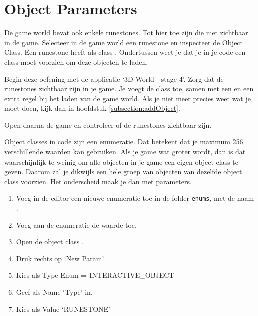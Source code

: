 \chapter{Object Parameters}
De game world bevat ook enkele runestones. Tot hier toe zijn die niet zichtbaar in de game. Selecteer in de game world een runestone en inspecteer de Object Class. Een runestone heeft als class . Ondertussen weet je dat je in je code een class moet voorzien om deze objecten te laden.

\begin{exercise}
	Begin deze oefening met de applicatie `3D World - stage 4'. Zorg dat de runestones zichtbaar zijn in je game. Je voegt de class  toe, samen met een  en een extra regel bij het laden van de game world. Als je niet meer precies weet wat je moet doen, kijk dan in hoofdstuk \ref{subsection:addObject}.

	Open daarna de game en controleer of de runestones zichtbaar zijn.
\end{exercise}

Object classes in code zijn een enumeratie. Dat betekent dat je maximum 256 verschillende waarden kan gebruiken. Als je game wat groter wordt, dan is dat waarschijnlijk te weinig om alle objecten in je game een eigen object class te geven. Daarom zal je dikwijls een hele groep van objecten van dezelfde object class voorzien. Het onderscheid maak je dan met parameters.

\begin{exercise}
	\begin{enumerate}
		\item Voeg in de editor een nieuwe enumeratie toe in de folder \texttt{enums}, met de naam .
		\item Voeg aan de enumeratie de waarde  toe.
		\item Open de object class . 
		\item Druk rechts op `New Param'.
		\item Kies als Type Enum$\Rightarrow$INTERACTIVE\_OBJECT
		\item Geef als Name `Type' in.
		\item Kies als Value `RUNESTONE'
	\end{enumerate}
\end{exercise}

